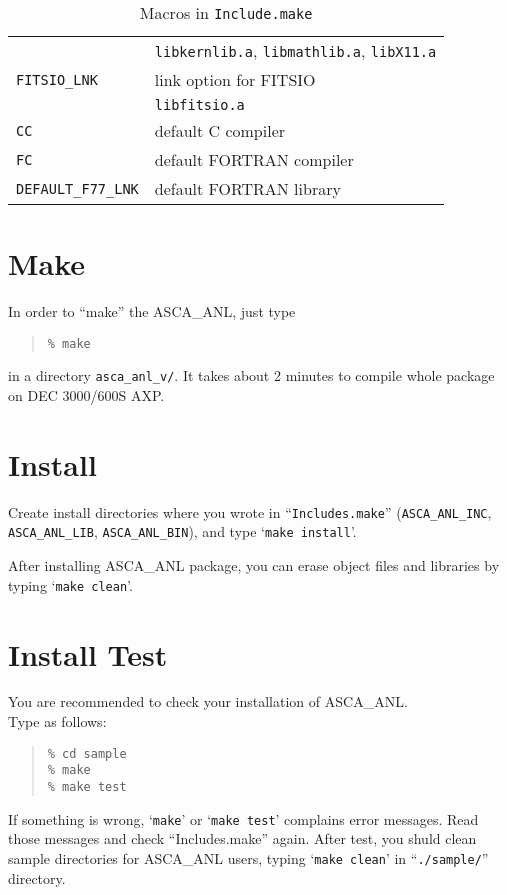 \begin{table}[htb]
\begin{center}
\begin{tabular}{ll}
	& {\tt libkernlib.a}, {\tt libmathlib.a}, {\tt libX11.a} \\
   {\tt FITSIO\_LNK}    & link option for FITSIO \\
	& {\tt libfitsio.a} \\
   {\tt CC}             & default C compiler \\
   {\tt FC}             & default FORTRAN compiler \\
   {\tt DEFAULT\_F77\_LNK} & default FORTRAN library \\
\hline
\end{tabular}
\caption{Macros in {\tt Include.make}}
\label{tab:macros}
\end{center}
\end{table}

\section{Make}
In order to ``make'' the ASCA\_ANL,
just type
\begin{quote}
   {\tt \%  make}
\end{quote}
in a directory {\tt asca\_anl\_v\ANLversion /}.
It takes about 2 minutes to compile whole package on DEC 3000/600S AXP.

\section{Install}
Create install directories where you wrote in ``{\tt Includes.make}''
({\tt ASCA\_ANL\_INC}, {\tt ASCA\_ANL\_LIB}, {\tt ASCA\_ANL\_BIN}), and
type `{\tt make install}'.

After installing ASCA\_ANL package, you can erase object files and libraries
by typing `{\tt make clean}'.
  
\section{Install Test}
You are recommended to check your installation of ASCA\_ANL.\\
Type as follows:\\
\begin{quote}
	{\tt \% cd sample} \\
	{\tt \% make} \\
	{\tt \% make test} \\
\end{quote}
If something is wrong, `{\tt make}' or `{\tt make test}'
complains error messages.
Read those messages and check ``Includes.make'' again.
After test, you shuld clean sample directories for ASCA\_ANL users,
typing `{\tt make clean}' in ``{\tt ./sample/}'' directory.
